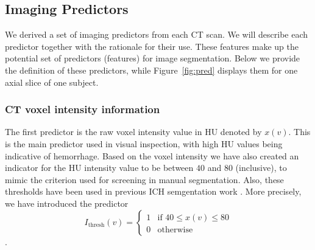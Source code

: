 \documentclass{elsarticle_nonatbib}\usepackage[]{graphicx}\usepackage[]{color}
\begin{document}
\subsection{Imaging Predictors}
\label{sec:predictors}
We derived a set of imaging predictors from each CT scan.  We will describe each predictor together with the rationale for their use.  These features make up the potential set of predictors (features) for image segmentation.  Below we provide the definition of these predictors, while Figure~\ref{fig:pred} displays them for one axial slice of one subject.

\subsubsection{CT voxel intensity information} The first predictor is the raw voxel intensity value in HU denoted by $x(v)$. This is the main predictor used in visual inspection, with high HU values being indicative of hemorrhage. Based on the voxel intensity we have also created an indicator for the HU intensity value to be between $40$ and $80$ (inclusive), to mimic the criterion used for screening in manual segmentation. Also, these thresholds have been used in previous ICH semgentation work \citep{prakash_segmentation_2012}. More precisely, we have introduced the predictor $$
I_{\text{thresh}}(v) = \begin{cases}
1 & \text{if } 40 \leq x(v) \leq 80 \\
0 & \text{otherwise}
\end{cases}
$$.
\end{document}
